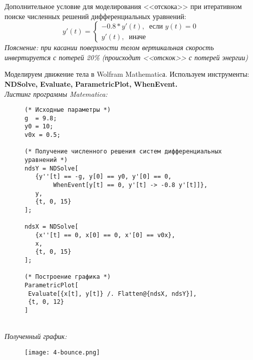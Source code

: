 Дополнительное условие для моделирования <<отскока>>
при итеративном поиске численных решений дифференциальных уравнений:
\begin{equation*}
    y'(t) = 
    \left\{
        \begin{gathered}
            -0.8*y'(t), \;\; \text{если } y(t) = 0\\
            y'(t), \;\; \text{иначе} 
        \end{gathered}
    \right. 
\end{equation*}
\textit{Пояснение: при касании поверхности телом вертикальная скорость инвертируется с потерей 20\% (происходит <<отскок>> с потерей энергии)}

\newpage
Моделируем движение тела в Wolfram Mathematicа. 
Используем инструменты: 
\textbf{NDSolve,} %
\textbf{Evaluate,} %
\textbf{ParametricPlot,} %
\textbf{WhenEvent.}\\[10pt]

\textit{Листинг программы Matematica:}
\begin{figure}[ht]
    \begin{lstlisting}
(* Исходные параметры *)
g  = 9.8;
y0 = 10;
v0x = 0.5;

(* Получение численного решения систем дифференциальных уравнений *)
ndsY = NDSolve[
   {y''[t] == -g, y[0] == y0, y'[0] == 0, 
        WhenEvent[y[t] == 0, y'[t] -> -0.8 y'[t]]},
   y,
   {t, 0, 15}
];

ndsX = NDSolve[
   {x''[t] == 0, x[0] == 0, x'[0] == v0x},
   x,
   {t, 0, 15}
];

(* Построение графика *)
ParametricPlot[
 Evaluate[{x[t], y[t]} /. Flatten@{ndsX, ndsY}], 
 {t, 0, 12}
]
    \end{lstlisting} 
\end{figure}\\[0pt]
\textit{Полученный график:}
\begin{figure}[ht]
\centering
\texttt{[image: 4-bounce.png]}
\end{figure}
